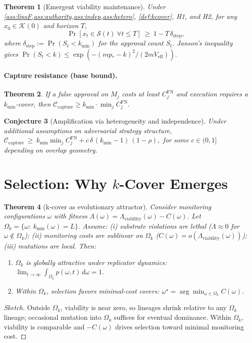 \documentclass[11pt]{article}
\newtheorem{theorem}{Theorem}[section]
\newtheorem{conjecture}[theorem]{Conjecture}
\theoremstyle{definition}
\newcommand{\K}{\mathcal{K}}
\newcommand{\Sset}{\mathcal{S}}
\begin{document}
\begin{theorem}[Emergent viability maintenance]\label{thm:emergence}
Under \cref{ass:lipsF,ass:authority,ass:indep,ass:hetero}, \cref{def:kcover}, H1, and H2, for any $x_0\in \K(0)$ and horizon $T$,
\[
\Pr[x_t\in \Sset(t)\ \forall t\le T]\ \ge\ 1 - T\,\delta_{\mathrm{step}},
\]
where $\delta_{\mathrm{step}}:=\Pr(S_t<k_{\min})$ for the approval count $S_t$. Janson's inequality gives
\(
\Pr(S_t<k)\le \exp(- (m p_\ast-k)^2/(2m V_{\mathrm{eff}})).
\)
\end{theorem}

\paragraph{Capture resistance (base bound).}
\begin{theorem}\label{thm:capture}
If a false approval on $M_j$ costs at least $C_j^{\mathrm{FN}}$ and execution requires a $k_{\min}$-cover, then
\(
\mathcal C_{\mathrm{capture}} \ge k_{\min}\cdot \min_j C_j^{\mathrm{FN}}.
\)
\end{theorem}
\begin{conjecture}[Amplification via heterogeneity and independence]\label{conj:amplify}
Under additional assumptions on adversarial strategy structure,
\(
\mathcal C_{\mathrm{capture}}\ \ge\ k_{\min}\min_j C_j^{\mathrm{FN}} + c\,\delta\,(k_{\min}-1)\,(1-\rho),
\)
for some $c\in(0,1]$ depending on overlap geometry.
\end{conjecture}

\section{Selection: Why $k$-Cover Emerges}
\begin{theorem}[k-cover as evolutionary attractor]\label{thm:evoFormal}
Consider monitoring configurations $\omega$ with fitness $\Lambda(\omega)=\Lambda_{\text{viability}}(\omega)-C(\omega)$. Let $\Omega_k=\{\omega:\ k_{\min}(\omega)=L\}$. Assume: (i) substrate violations are lethal ($\Lambda\approx 0$ for $\omega\notin \Omega_k$); (ii) monitoring costs are sublinear on $\Omega_k$ ($C(\omega)=o(\Lambda_{\text{viability}}(\omega))$); (iii) mutations are local. Then:
\begin{enumerate}[leftmargin=1.4em]
\item $\Omega_k$ is globally attractive under replicator dynamics: $\lim_{t\to\infty}\int_{\Omega_k}p(\omega,t)\,d\omega=1$.
\item Within $\Omega_k$, selection favors minimal-cost covers: $\omega^\star=\arg\min_{\omega\in \Omega_k} C(\omega)$.
\end{enumerate}
\end{theorem}
\begin{proof}[Sketch]
Outside $\Omega_k$, viability is near zero, so lineages shrink relative to any $\Omega_k$ lineage; occasional mutation into $\Omega_k$ suffices for eventual dominance. Within $\Omega_k$, viability is comparable and $-C(\omega)$ drives selection toward minimal monitoring cost.
\end{proof}
\end{document}
